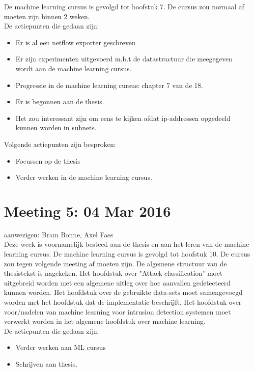 \noindent De machine learning cursus is gevolgd tot hoofstuk 7. De cursus zou normaal af moeten zijn binnen 2 weken. \\

\noindent De actiepunten die gedaan zijn:
\begin{itemize}  
		\item Er is al een netflow exporter geschreven
        \item Er zijn experimenten uitgevoerd m.b.t de datastructuur die meegegeven wordt aan de machine learning cursus.
        \item Progressie in de machine learning cursus: chapter 7 van de 18.
        \item Er is begonnen aan de thesis. 
        \item Het zou interessant zijn om eens te kijken ofdat ip-addressen opgedeeld kunnen worden in subnets.
\end{itemize}

\noindent Volgende actiepunten zijn besproken:
\begin{itemize}  
        \item Focussen op de thesis
        \item Verder werken in de machine learning cursus.
\end{itemize}

\section{Meeting 5: 04 Mar 2016}
aanwezigen: Bram Bonne, Axel Faes\\

\noindent Deze week is voornamelijk besteed aan de thesis en aan het leren van de machine learning cursus. De machine learning cursus is gevolgd tot hoofstuk 10. De cursus zou tegen volgende meeting af moeten zijn. De algemene structuur van de thesistekst is nagekeken. Het hoofdstuk over "Attack classification" moet uitgebreid worden met een algemene uitleg over hoe aanvallen gedetecteerd kunnen worden. Het hoofdstuk over de gebruikte data-sets moet samengevoegd worden met het hoofdstuk dat de implementatie beschrijft. Het hoofdstuk over voor/nadelen van machine learning voor intrusion detection systemen moet verwerkt worden in het algemene hoofdstuk over machine learning.\\

\noindent De actiepunten die gedaan zijn:
\begin{itemize}  
		\item Verder werken aan ML cursus
        \item Schrijven aan thesis.
\end{itemize}

